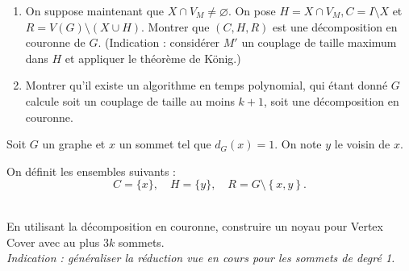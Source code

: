 \begin{td-exo}
\begin{enumerate}[start=3]
        \item On suppose maintenant que \(X \cap V_M \neq \varnothing\).
        On pose \(H = X \cap V_M, C = I \setminus X\) et \(R = V(G) \setminus (X \cup H)\).
        Montrer que \((C, H, R)\) est une d\'ecomposition en couronne de \(G\).
        (Indication : consid\'erer \(M'\) un couplage de taille maximum dans \(H\) et appliquer le th\'eor\`eme de K\"onig.)

        \item Montrer qu'il existe un algorithme en temps polynomial, qui \'etant donn\'e \(G\) calcule soit un couplage de taille au moins \(k + 1\), soit une d\'ecomposition en couronne.
    \end{enumerate}
\end{td-exo}

\begin{td-sol}
    Soit \(G\) un graphe et \(x\) un sommet tel que \(d_G(x) = 1\).
    On note \(y\) le voisin de \(x\).

    On d\'efinit les ensembles suivants :
    \begin{equation*}
        C = \{x\}, \quad H = \{y\}, \quad R = G \setminus \left\{x, y\right\}.
    \end{equation*}
\end{td-sol}

\begin{td-exo}\,\\
    En utilisant la d\'ecomposition en couronne, construire un noyau pour Vertex Cover avec au plus \(3k\) sommets.\\
    \textit{Indication : g\'en\'eraliser la r\'eduction vue en cours pour les sommets de degr\'e 1.}
\end{td-exo}

